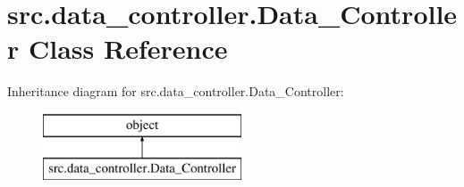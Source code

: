 \hypertarget{classsrc_1_1data__controller_1_1_data___controller}{\section{src.\-data\-\_\-controller.\-Data\-\_\-\-Controller Class Reference}
\label{classsrc_1_1data__controller_1_1_data___controller}
}
Inheritance diagram for src.\-data\-\_\-controller.\-Data\-\_\-\-Controller\-:\begin{figure}[H]
\begin{center}
\leavevmode
\includegraphics[height=2.000000cm]{classsrc_1_1data__controller_1_1_data___controller}
\end{center}
\end{figure}
